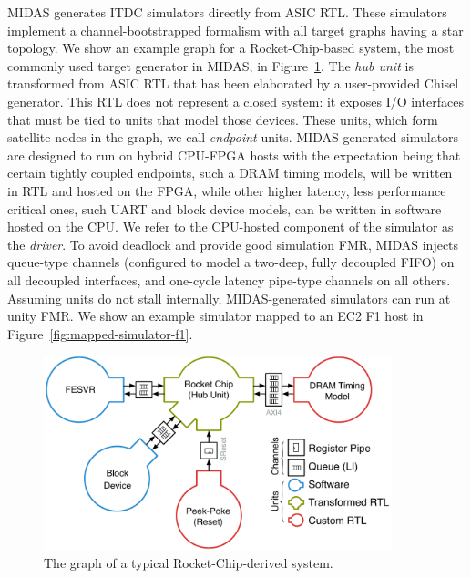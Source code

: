 MIDAS generates ITDC simulators directly from ASIC RTL. These simulators
implement a channel-bootstrapped formalism with all target graphs having a
star topology. We show an example graph for a Rocket-Chip-based system, the
most commonly used target generator in MIDAS, in Figure~\ref{fig:rocket-target-graph}.
The \emph{hub unit} is transformed from ASIC RTL that has been elaborated by a user-provided Chisel
generator. This RTL does not represent a
closed system: it exposes I/O interfaces that must be tied to units that model those
devices. These units, which form satellite nodes in the graph, we call \emph{endpoint} units.
MIDAS-generated simulators are designed to run on hybrid CPU-FPGA hosts
with the expectation being that certain tightly coupled endpoints, such a DRAM
timing models, will be written in RTL and hosted on the FPGA, while other higher
latency, less performance critical ones, such UART and block device models, can
be written in software hosted on the CPU. We refer to the CPU-hosted component
of the simulator as the \emph{driver}. To avoid deadlock and provide good
simulation FMR, MIDAS injects queue-type channels (configured to model a two-deep,
fully decoupled FIFO) on all decoupled interfaces, and one-cycle latency
pipe-type channels on all others. Assuming units do not stall internally, MIDAS-generated
simulators can run at unity FMR. We show an example simulator mapped to an EC2 F1 host in Figure~\ref{fig:mapped-simulator-f1}.

\begin{figure}
    \centering
    \includegraphics[width=0.9\textwidth]{figures/rocket-target-graph.pdf}
    \caption{The graph of a typical Rocket-Chip-derived system.}
    \label{fig:rocket-target-graph}
\end{figure}


